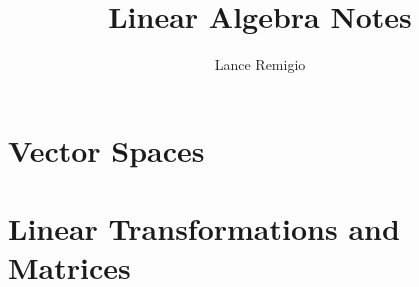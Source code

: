 \documentclass[11pt,a4paper]{book}
\title{Linear Algebra Notes}
\author{Lance Remigio}
\begin{document}
\maketitle
\tableofcontents
\listoftheorems[ignoreall,show={theorem,defn}]
\chapter{Vector Spaces}











\chapter{Linear Transformations and Matrices}










\end{document}
